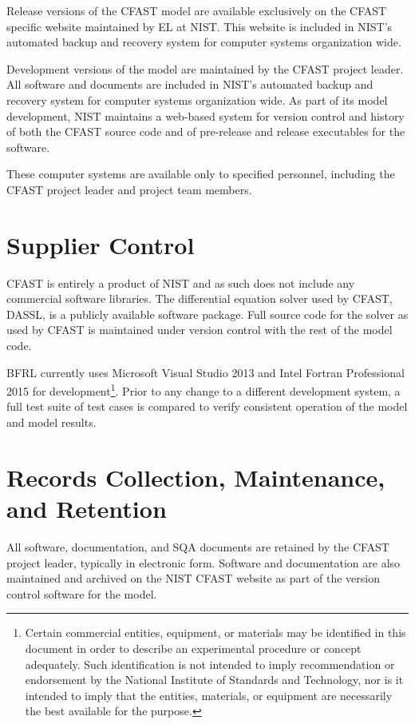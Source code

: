 Release versions of the CFAST model are available exclusively on the CFAST specific website maintained by EL at NIST. This website is included in NIST's automated backup and recovery system for computer systems organization wide.

Development versions of the model are maintained by the CFAST project leader.  All software and documents are included in NIST's automated backup and recovery system for computer systems organization wide. As part of its model development, NIST maintains a web-based system for version control and history of both the CFAST source code and of pre-release and release executables for the software.

These computer systems are available only to specified personnel, including the CFAST project leader and project team members.

\section{Supplier Control}

CFAST is entirely a product of NIST and as such does not include any commercial software libraries. The differential equation solver used by CFAST, DASSL, is a publicly available software package.  Full source code for the solver as used by CFAST is maintained under version control with the rest of the model code.

BFRL currently uses Microsoft Visual Studio 2013 and Intel Fortran Professional 2015 for development\footnote{Certain commercial entities, equipment, or materials may be identified in this document
in order to describe an experimental procedure or concept adequately. Such identification
is not intended to imply recommendation or endorsement by the National Institute of
Standards and Technology, nor is it intended to imply that the entities, materials, or
equipment are necessarily the best available for the purpose.}.  Prior to any change to a different development system, a full test suite of test cases is compared to verify consistent operation of the model and model results.

\section{Records Collection, Maintenance, and Retention}

All software, documentation, and SQA documents are retained by the CFAST project leader, typically in electronic form. Software and documentation are also maintained and archived on the NIST CFAST website as part of the version control software for the model.

